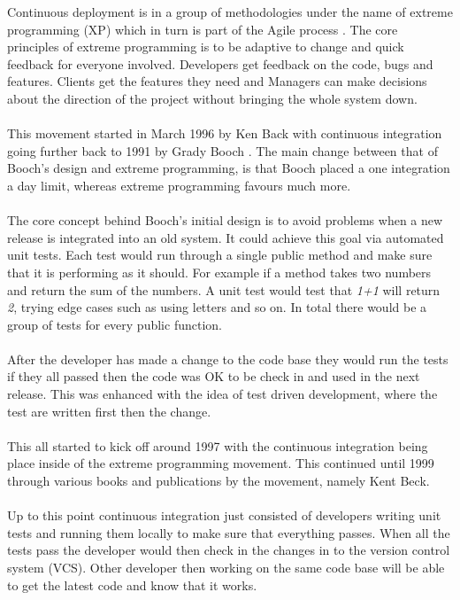 Continuous deployment is in a group of methodologies under the name of extreme programming (XP) which in turn is part of the Agile process \citep{XP}. The core principles of extreme programming is to be adaptive to change and quick feedback for everyone involved. Developers get feedback on the code, bugs and features. Clients get the features they need and Managers can make decisions about the direction of the project without bringing the whole system down. \citep{mf}
\\\\
This movement started in March 1996 by Ken Back \citep{XPH} with continuous integration going further back to 1991 by Grady Booch \citep{CIF}. The main change between that of Booch's design and extreme programming, is that Booch placed a one integration a day limit, whereas extreme programming favours much more.
\\\\
The core concept behind Booch's initial design is to avoid problems when a new release is integrated into an old system. It could achieve this goal via automated unit tests. Each test would run through a single public method and make sure that it is performing as it should. For example if a method takes two numbers and return the sum of the numbers. A unit test would test that \textit{1+1} will return \textit{2}, trying edge cases such as using letters and so on. In total there would be a group of tests for every public function. \citep{unit_tests}
\\\\
After the developer has made a change to the code base they would run the tests if they all passed then the code was OK to be check in and used in the next release. This was enhanced with the idea of test driven development, where the test are written first then the change.
\\\\
This all started to kick off around 1997 with the continuous integration being place inside of the extreme programming movement.  This continued until 1999 through various books and publications by the movement, namely Kent Beck. \citep{CIF}
\\\\
Up to this point continuous integration just consisted of developers writing unit tests and running them locally to make sure that everything passes. When all the tests pass the developer would then check in the changes in to the version control system (VCS). Other developer then working on the same code base will be able to get the latest code and know that it works.
